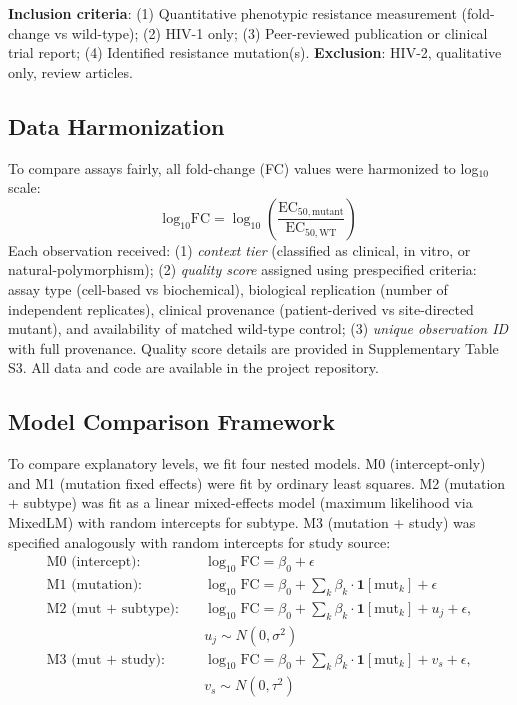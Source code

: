 \documentclass[12pt,a4paper]{article}
\begin{document}
\textbf{Inclusion criteria}: (1) Quantitative phenotypic resistance measurement (fold-change vs wild-type); (2) HIV-1 only; (3) Peer-reviewed publication or clinical trial report; (4) Identified resistance mutation(s). \textbf{Exclusion}: HIV-2, qualitative only, review articles.

\subsection{Data Harmonization}

To compare assays fairly, all fold-change (FC) values were harmonized to log$_{10}$ scale:
\begin{equation}
\text{log}_{10}\text{FC} = \log_{10}\left(\frac{\text{EC}_{50,\text{mutant}}}{\text{EC}_{50,\text{WT}}}\right)
\end{equation}
Each observation received: (1) \textit{context tier} (classified as clinical, in vitro, or natural-polymorphism); (2) \textit{quality score} assigned using prespecified criteria: assay type (cell-based vs biochemical), biological replication (number of independent replicates), clinical provenance (patient-derived vs site-directed mutant), and availability of matched wild-type control; (3) \textit{unique observation ID} with full provenance. Quality score details are provided in Supplementary Table S3. All data and code are available in the project repository.

\subsection{Model Comparison Framework}

To compare explanatory levels, we fit four nested models. M0 (intercept-only)
and M1 (mutation fixed effects) were fit by ordinary least squares.
M2 (mutation + subtype) was fit as a linear mixed-effects model
(maximum likelihood via MixedLM) with random intercepts for subtype.
M3 (mutation + study) was specified analogously with random intercepts
for study source:
\begin{align}
\text{M0 (intercept):} &\quad \log_{10}\text{FC} = \beta_0 + \epsilon \\
\text{M1 (mutation):} &\quad \log_{10}\text{FC} = \beta_0 + \sum_k \beta_k \cdot \mathbf{1}[\text{mut}_k] + \epsilon \\
\text{M2 (mut + subtype):} &\quad \log_{10}\text{FC} = \beta_0 + \sum_k \beta_k \cdot \mathbf{1}[\text{mut}_k] + u_j + \epsilon, \\
&\quad u_j \sim N(0, \sigma^2) \\
\text{M3 (mut + study):} &\quad \log_{10}\text{FC} = \beta_0 + \sum_k \beta_k \cdot \mathbf{1}[\text{mut}_k] + v_s + \epsilon, \\
&\quad v_s \sim N(0, \tau^2)
\end{align}
\end{document}
